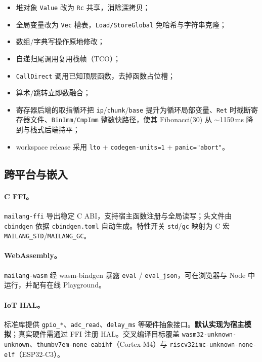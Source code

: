 \documentclass[10pt,a4paper]{article}
\begin{document}
\begin{itemize}
  \item 堆对象 \texttt{Value} 改为 \texttt{Rc} 共享，消除深拷贝；
  \item 全局变量改为 \texttt{Vec} 槽表，\texttt{Load/StoreGlobal} 免哈希与字符串克隆；
  \item 数组/字典写操作原地修改；
  \item 自递归尾调用复用栈帧（TCO）；
  \item \texttt{CallDirect} 调用已知顶层函数，去掉函数占位槽；
  \item 算术/跳转立即数融合；
  \item 寄存器后端的取指循环把 \texttt{ip}/\texttt{chunk}/\texttt{base} 提升为循环局部变量、\texttt{Ret} 时截断寄存器文件、\texttt{BinImm}/\texttt{CmpImm} 整数快路径，使其 Fibonacci(30) 从 $\sim$1150\,ms 降到与栈式后端持平；
  \item workspace release 采用 \texttt{lto} + \texttt{codegen-units=1} + \texttt{panic="abort"}。
\end{itemize}

\subsection{跨平台与嵌入}

\paragraph{C FFI。}
\texttt{mailang-ffi} 导出稳定 C ABI，支持宿主函数注册与全局读写；头文件由 \texttt{cbindgen} 依据 \texttt{cbindgen.toml} 自动生成。特性开关 \texttt{std}/\texttt{gc} 映射为 C 宏 \texttt{MAILANG\_STD}/\texttt{MAILANG\_GC}。

\paragraph{WebAssembly。}
\texttt{mailang-wasm} 经 wasm-bindgen 暴露 \texttt{eval} / \texttt{eval\_json}，可在浏览器与 Node 中运行，并配有在线 Playground。

\paragraph{IoT HAL。}
标准库提供 \texttt{gpio\_*}、\texttt{adc\_read}、\texttt{delay\_ms} 等硬件抽象接口。\textbf{默认实现为宿主模拟}；真实硬件需通过 FFI 注册 HAL。交叉编译目标覆盖 \texttt{wasm32-unknown-unknown}、\texttt{thumbv7em-none-eabihf}（Cortex-M4）与 \texttt{riscv32imc-unknown-none-elf}（ESP32-C3）。
\end{document}
